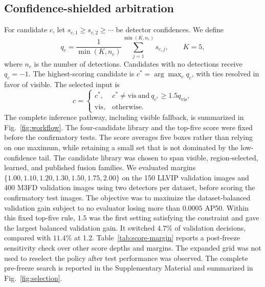 \documentclass[preprint,11pt]{elsarticle}
\begin{document}
\subsection{Confidence-shielded arbitration}

For candidate \(c\), let
\(s_{c,1}\ge s_{c,2}\ge\cdots\) be detector confidences. We define
\begin{equation}
q_c=\frac{1}{\min(K,n_c)}
\sum_{j=1}^{\min(K,n_c)}s_{c,j},
\qquad K=5,
\end{equation}
where \(n_c\) is the number of detections. Candidates with no detections receive
\(q_c=-1\). The highest-scoring candidate is
\(c^\ast=\arg\max_c q_c\), with ties resolved in favor of visible. The selected
input is
\begin{equation}
c=
\begin{cases}
c^\ast, & c^\ast\ne\mathrm{vis}\ \text{and}\ q_{c^\ast}\ge1.5q_{\mathrm{vis}},\\
\mathrm{vis}, & \text{otherwise}.
\end{cases}
\end{equation}
The complete inference pathway, including visible fallback, is summarized in
Fig.~\ref{fig:workflow}.
The four-candidate library and the top-five score were fixed before the
confirmatory tests. The score averages five boxes rather than relying on one
maximum, while retaining a small set that is not dominated by the low-confidence
tail. The candidate library was chosen to span visible, region-selected,
learned, and published fusion families. We evaluated margins
\(\{1.00,1.10,1.20,1.30,1.50,1.75,2.00\}\) on the 150 LLVIP validation images
and 400 M3FD validation images using two detectors per dataset, before scoring
the confirmatory test images. The objective was to maximize the
dataset-balanced validation gain subject to no evaluator losing more than
\(0.0005\) AP50. Within this fixed top-five rule, \(1.5\) was the first setting
satisfying the constraint and gave the largest balanced validation gain. It
switched \(4.7\%\) of validation decisions, compared with \(11.4\%\) at 1.2.
Table~\ref{tab:score-margin} reports a post-freeze sensitivity check over other
score depths and margins. The expanded grid was not used to reselect the policy
after test performance was observed. The complete pre-freeze search is reported
in the Supplementary Material and summarized in Fig.~\ref{fig:selection}.
\end{document}
